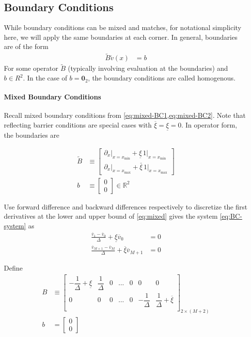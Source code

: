 \documentclass[11pt]{article}
\newcommand{\R}{\ensuremath{\mathbb{R}}}
\theoremstyle{definition}
\begin{document}
\subsection{Boundary Conditions}
While boundary conditions can be mixed and matches, for notational simplicity here, we will apply the same boundaries at each corner.  In general, boundaries are of the form
\begin{align}
\tilde{B} \tilde{v}(x) &= b\label{eq:BC-system}
\end{align}
For some operator $\tilde{B}$ (typically involving evaluation at the boundaries) and $b\in R^2$.  In the case of $b = \textbf{0}_2$, the boundary conditions are called homogenous.

\paragraph{Mixed Boundary Conditions}
Recall mixed boundary conditions from \cref{eq:mixed-BC1,eq:mixed-BC2}. Note that reflecting barrier conditions are special cases with $\overline{\xi} = \underline{\xi} = 0$.  In operator form, the boundaries are

\begin{align}
\tilde{B} &\equiv \begin{bmatrix}
\partial_x\vert_{x = x_{\min}} + \underline{\xi}\,1 \vert_{x = x_{\min}}\\
\partial_x\vert_{x = x_{\max}} + \bar{\xi}\,1 \vert_{x = x_{\max}}
\end{bmatrix}\label{eq:mixed}\\
b &\equiv \begin{bmatrix} 0\\ 0 \end{bmatrix}\in \R^2
\end{align}

Use forward difference and backward differences respectively to discretize the first derivatives at the lower and upper bound of \cref{eq:mixed} gives the system \cref{eq:BC-system} as
\begin{align}
\frac{\overline{v}_1 - \overline{v}_0}{\Delta} + \underline{\xi} \overline{v}_0 &= 0\label{eq:regular-mixed-1} \\
\frac{\overline{v}_{M+1} - \overline{v}_M}{\Delta} + \overline{\xi} \overline{v}_{M+1} &= 0\label{eq:regular-mixed-2}
\end{align}

Define
\begin{align}
B &\equiv \begin{bmatrix}
-\dfrac{1}{\Delta} + \underline{\xi} & \dfrac{1}{\Delta} & 0 & \dots & 0 & 0 & 0 \\
0 & 0 & 0 & \dots & 0 & -\dfrac{1}{\Delta} & \dfrac{1}{\Delta} + \overline{\xi}\\
\end{bmatrix}_{2 \times (M+2)}\label{eq:mixed-barrier-matrix-original-regular}\\
b &= \begin{bmatrix}
0 \\
0
\end{bmatrix}
\end{align}
\end{document}
